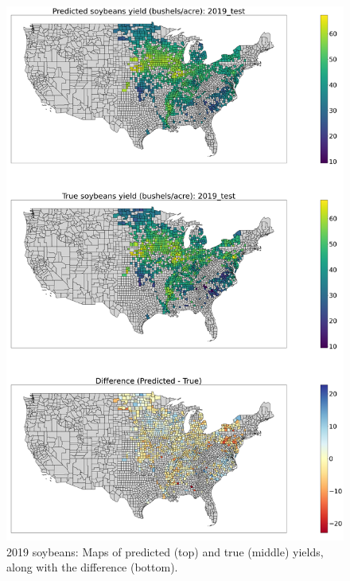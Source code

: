 \begin{figure}[H]
\centering
\includegraphics[width=0.95\columnwidth]{figs/true_vs_predicted_map_soybeans_2019_test.png}
\caption{2019 soybeans: Maps of predicted (top) and true (middle) yields, along with the difference (bottom).}
\label{fig:map_2019soy}
\end{figure}
